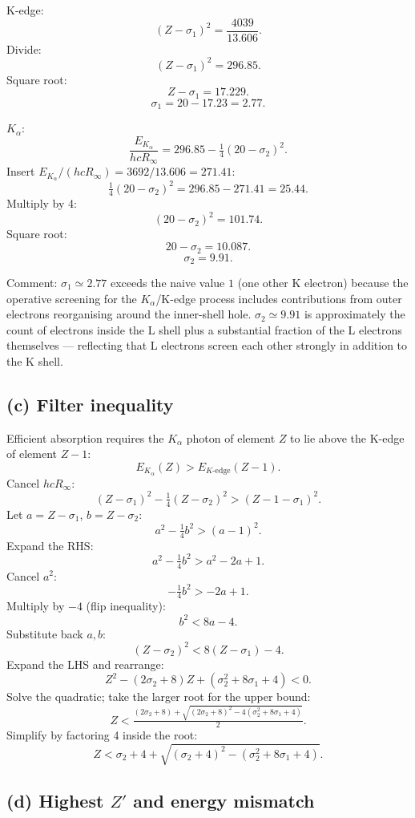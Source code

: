 \documentclass[11pt]{article}
\begin{document}
K-edge:
\[
(Z-\sigma_{1})^{2}=\frac{4039}{13.606}.
\]
Divide:
\[
(Z-\sigma_{1})^{2}=296.85.
\]
Square root:
\[
Z-\sigma_{1}=17.229.
\]
\[
\boxed{\;\sigma_{1}=20-17.23=2.77.\;}
\]

$K_{\alpha}$:
\[
\frac{E_{K_{\alpha}}}{hcR_{\infty}}=296.85-\tfrac14(20-\sigma_{2})^{2}.
\]
Insert $E_{K_{\alpha}}/(hcR_{\infty})=3692/13.606=271.41$:
\[
\tfrac14(20-\sigma_{2})^{2}=296.85-271.41=25.44.
\]
Multiply by 4:
\[
(20-\sigma_{2})^{2}=101.74.
\]
Square root:
\[
20-\sigma_{2}=10.087.
\]
\[
\boxed{\;\sigma_{2}=9.91.\;}
\]

Comment: $\sigma_{1}\simeq 2.77$ exceeds the naive value $1$ (one other K electron) because the operative screening for the $K_{\alpha}$/K-edge process includes contributions from outer electrons reorganising around the inner-shell hole. $\sigma_{2}\simeq 9.91$ is approximately the count of electrons inside the L shell plus a substantial fraction of the L electrons themselves --- reflecting that L electrons screen each other strongly in addition to the K shell.

\subsection*{(c) Filter inequality}

Efficient absorption requires the $K_{\alpha}$ photon of element $Z$ to lie above the K-edge of element $Z-1$:
\[
E_{K_{\alpha}}(Z)>E_{K\text{-edge}}(Z-1).
\]
Cancel $hcR_{\infty}$:
\[
(Z-\sigma_{1})^{2}-\tfrac14(Z-\sigma_{2})^{2}>(Z-1-\sigma_{1})^{2}.
\]
Let $a=Z-\sigma_{1}$, $b=Z-\sigma_{2}$:
\[
a^{2}-\tfrac14 b^{2}>(a-1)^{2}.
\]
Expand the RHS:
\[
a^{2}-\tfrac14 b^{2}>a^{2}-2a+1.
\]
Cancel $a^{2}$:
\[
-\tfrac14 b^{2}>-2a+1.
\]
Multiply by $-4$ (flip inequality):
\[
b^{2}<8a-4.
\]
Substitute back $a,b$:
\[
(Z-\sigma_{2})^{2}<8(Z-\sigma_{1})-4.
\]
Expand the LHS and rearrange:
\[
Z^{2}-(2\sigma_{2}+8)Z+(\sigma_{2}^{2}+8\sigma_{1}+4)<0.
\]
Solve the quadratic; take the larger root for the upper bound:
\[
Z<\tfrac{(2\sigma_{2}+8)+\sqrt{(2\sigma_{2}+8)^{2}-4(\sigma_{2}^{2}+8\sigma_{1}+4)}}{2}.
\]
Simplify by factoring 4 inside the root:
\begin{equation}
\boxed{\;Z<\sigma_{2}+4+\sqrt{(\sigma_{2}+4)^{2}-(\sigma_{2}^{2}+8\sigma_{1}+4)}.\;}
\label{eq:filter}
\end{equation}

\subsection*{(d) Highest $Z'$ and energy mismatch}
\end{document}
